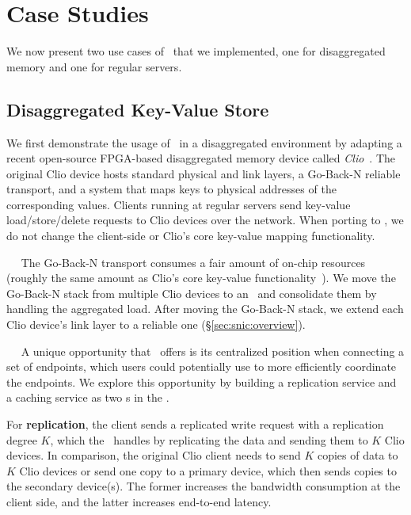 \section{Case Studies}
\label{sec:snic:application}

We now present two use cases of \snic\ that we implemented, one for disaggregated memory and one for regular servers.

\subsection{Disaggregated Key-Value Store}
\label{sec:snic:kvstore}
We first demonstrate the usage of \snic\ in a disaggregated environment by adapting a
recent open-source FPGA-based disaggregated memory device called {\em Clio}~\cite{Clio}.
The original Clio device hosts standard physical and link layers, a Go-Back-N reliable transport, and a system that maps keys to physical addresses of the corresponding values.
Clients running at regular servers send key-value load/store/delete requests to Clio devices over the network.
When porting to \snic, we do not change the client-side or Clio's core key-value mapping functionality.

~~
The Go-Back-N transport consumes a fair amount of on-chip resources %
(roughly the same amount as Clio's core key-value functionality~\cite{clio-arxiv}).
We move the Go-Back-N stack from multiple Clio devices to an \snic\ and consolidate them by handling the aggregated load.
After moving the Go-Back-N stack, we extend each Clio device's link layer to a reliable one (\S\ref{sec:snic:overview}).

~~
A unique opportunity that \snic\ offers is its centralized position when connecting a set of endpoints, which users could potentially use to more efficiently coordinate the endpoints.
We explore this opportunity by building a replication service and a caching service as two \nt{}s in the \snic.

For \textbf{replication}, the client sends a replicated write request with a replication degree $K$, which the \snic\ handles by replicating the data and sending them to $K$ Clio devices. 
In comparison, the original Clio client needs to send $K$ copies of data to $K$ Clio devices or send one copy to a primary device, which then sends copies to the secondary device(s).
The former increases the bandwidth consumption at the client side, and the latter increases end-to-end latency.

